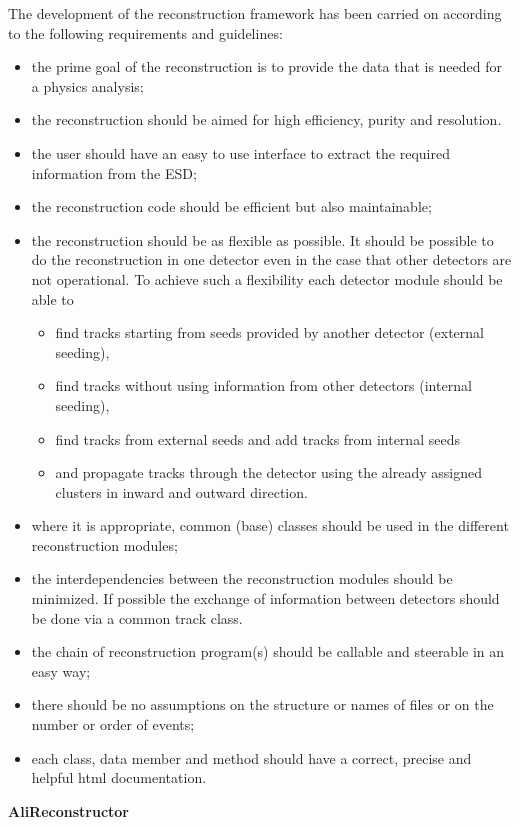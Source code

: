 \documentclass[12pt,a4paper,twoside]{article}
\begin{document}
The development of the reconstruction framework has been carried on
according to the following requirements and guidelines:
\begin{itemize}
\item the prime goal of the reconstruction is to provide the data that
  is needed for a  physics analysis; 
\item the reconstruction should be aimed for high efficiency, purity and resolution.
\item the user should have an easy to use interface to extract the
  required information from the ESD; 
\item the reconstruction code should be efficient but also maintainable;
\item the reconstruction should be as flexible as possible.
  It should be possible to do the reconstruction in one detector even in
  the case that other detectors are not operational. 
  To achieve such a flexibility each detector module should be able to
  \begin{itemize}
  \item find tracks starting from seeds provided by another detector
    (external seeding), 
  \item find tracks without using information from other detectors
    (internal seeding), 
  \item find tracks from external seeds and add tracks from internal seeds
  \item and propagate tracks through the detector using the already
    assigned clusters in inward and outward direction. 
  \end{itemize}
\item where it is appropriate, common (base) classes should be used in
  the different reconstruction modules;
\item the interdependencies between the reconstruction modules should
  be minimized. 
  If possible the exchange of information between detectors should be
  done via a common track class. 
\item the chain of reconstruction program(s) should be callable and
  steerable in an easy way;
\item there should be no assumptions on the structure or names of files
  or on the number or order of events;
\item each class, data member and method should have a correct,
  precise and helpful html documentation. 
\end{itemize}


\noindent
\textbf{AliReconstructor}
\end{document}
